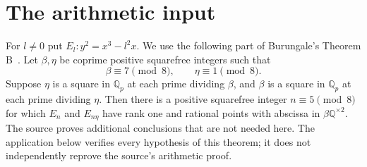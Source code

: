 \documentclass[11pt,a4paper]{article}
\newcommand{\Q}{\mathbb Q}
\begin{document}
\section{The arithmetic input}

For $l\ne0$ put $E_l:y^2=x^3-l^2x$.
We use the following part of Burungale's Theorem B~\cite{Burungale}.
Let $\beta,\eta$ be coprime positive squarefree integers such that
\[
 \beta\equiv7\pmod8,\qquad \eta\equiv1\pmod8.
\]
Suppose $\eta$ is a square in $\Q_p$ at each prime dividing $\beta$,
and $\beta$ is a square in $\Q_p$ at each prime dividing $\eta$.
Then there is a positive squarefree integer $n\equiv5\pmod8$ for
which $E_n$ and $E_{n\eta}$ have rank one and rational points with
abscissa in $\beta\Q^{\times2}$. The source proves additional
conclusions that are not needed here. The application below verifies
every hypothesis of this theorem; it does not independently reprove
the source's arithmetic proof.
\end{document}
